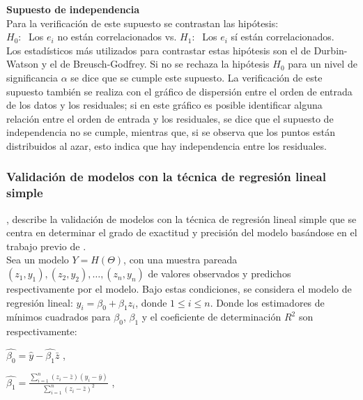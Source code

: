 \textbf{Supuesto de independencia}\\

Para la verificación de este supuesto se contrastan las hipótesis:\\

$H_0:\;$ Los $e_i$ no están correlacionados vs. $H_1:\;$ Los $e_i$ sí están correlacionados.\\

Los estadísticos más utilizados para contrastar estas hipótesis son el de Durbin-Watson y el de Breusch-Godfrey. Si no se rechaza la hipótesis $H_0$ para un nivel de significancia $\alpha$ se dice que se cumple este supuesto. La verificación de este supuesto también se realiza con el gráfico de dispersión entre el orden de entrada de los datos y los residuales; si en este gráfico es posible identificar alguna relación entre el orden de entrada y los residuales, se dice que el supuesto de independencia no se cumple, mientras que, si se observa que los puntos están distribuidos al azar, esto indica que hay independencia entre los residuales.


\subsubsection{Validación de modelos con la técnica de regresión lineal simple \parencite{febles-2014}}

\textcite{febles-2014}, describe la validación de modelos con la técnica de regresión lineal simple que se centra en determinar el grado de exactitud y precisión del modelo basándose en el trabajo previo de \textcite{balam-2012}.\\

Sea un modelo $Y = H(\Theta )$, con una muestra pareada $(z_{1}, y_{1}), (z_{2}, y_{2}) , \dots , (z_{n}, y_{n})$ de valores observados y predichos respectivamente por el modelo. Bajo estas condiciones, se considera el modelo de regresión lineal: $y_{i}= \beta_{0} + \beta_{1}z_{i}$, donde $ 1 \leq i \leq n$. Donde  los estimadores de mínimos cuadrados para $\beta_{0}$,  $\beta_{1}$ y el coeficiente de determinación $R^{2}$ son respectivamente: \\

\begin{center}
{\large$\hat{\beta_{0}} = \hat{y} - \hat{\beta_{1}} \bar{z}$} ,\\
\end{center}

\begin{center}
{\Large$ \hat{\beta_{1}} = \frac{\sum_{i=1}^{n} (z_{i} - \bar{z} ) (y_{i} - \bar{y})} {  \sum_{i=1}^{n} (z_{i} - \bar{z} )^{2} }$} , \\
\end{center}

